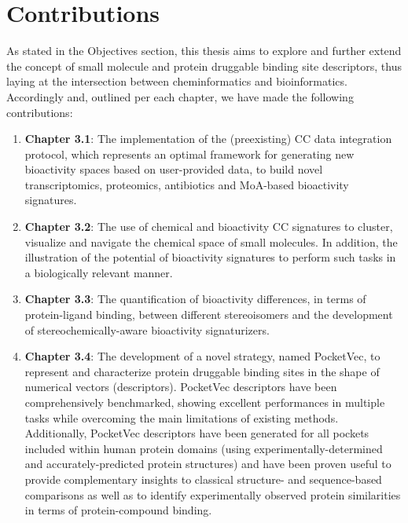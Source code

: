 \chapter{Contributions}
\label{Contributions}
\clearpage

As stated in the Objectives section, this thesis aims to explore and further extend the concept of small molecule and protein druggable binding site descriptors, thus laying at the intersection between cheminformatics and bioinformatics. Accordingly and, outlined per each chapter, we have made the following contributions:

\begin{enumerate}

\item \textbf{Chapter 3.1}: The implementation of the (preexisting) CC data integration protocol, which represents an optimal framework for generating new bioactivity spaces based on user-provided data, to build novel transcriptomics, proteomics, antibiotics and MoA-based bioactivity signatures. 

\item \textbf{Chapter 3.2}: The use of chemical and bioactivity CC signatures to cluster, visualize and navigate the chemical space of small molecules. In addition, the illustration of the potential of bioactivity signatures to perform such tasks in a biologically relevant manner.  

\item \textbf{Chapter 3.3}: The quantification of bioactivity differences, in terms of protein-ligand binding, between different stereoisomers and the development of stereochemically-aware bioactivity signaturizers. 

\item \textbf{Chapter 3.4}: The development of a novel strategy, named PocketVec, to represent and characterize protein druggable binding sites in the shape of numerical vectors (descriptors). PocketVec descriptors have been comprehensively benchmarked, showing excellent performances in multiple tasks while overcoming the main limitations of existing methods. Additionally, PocketVec descriptors have been generated for all pockets included within human protein domains (using experimentally-determined and accurately-predicted protein structures) and have been proven useful to provide complementary insights to classical structure- and sequence-based comparisons as well as to identify experimentally observed protein similarities in terms of protein-compound binding. 

\end{enumerate}
